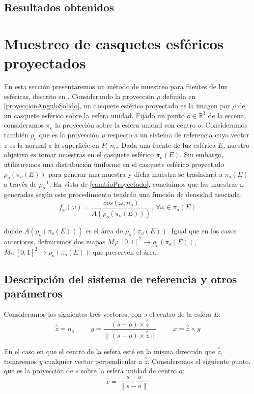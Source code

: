 \subsection{Resultados obtenidos}


\section{Muestreo de casquetes esféricos proyectados}

En esta sección presentaremos un método de muestreo para fuentes de luz esféricas, descrito en \cite{Urena2018}. Considerando la proyección $\rho$ definida en \ref{proyeccionAnguloSolido}, un casquete esférico proyectado es la imagen por $\rho$ de un casquete esférico sobre la esfera unidad. Fijado un punto $o\in\mathds{R}^3$ de la escena, consideramos $\pi_o$ la proyección sobre la esfera unidad con centro $o$. Consideramos también $\rho_o$ que es la proyección $\rho$ respecto a un sistema de referencia cuyo vector $z$ es la normal a la superficie en $P$, $n_o$. Dada una fuente de luz esférica $E$, nuestro objetivo es tomar muestras en el casquete esférico $\pi_o(E)$. Sin embargo, utilizaremos una distribución uniforme en el casquete esférico proyectado $\rho_o(\pi_o(E))$ para generar una muestra y dicha muestra se trasladará a $\pi_o(E)$ a través de $\rho_o^{-1}$. En vista de \ref{cambioProyectado}, concluimos que las muestras $\omega$ generadas según este procedimiento tendrán una función de densidad asociada:
$$f_{\omega}(\omega) = \frac{cos(\omega , n_o)}{A(\rho_o(\pi_o(E)))}\text{, }\forall \omega\in\pi_o(E)$$

donde $A(\rho_o(\pi_o(E)))$ es el área de $\rho_o(\pi_o(E))$. Igual que en los casos anteriores, definiremos dos mapas $M_s:[0,1]^2\rightarrow \rho_o(\pi_o(E))$, $M_t:[0,1]^2\rightarrow \rho_o(\pi_o(E))$ que preserven el área.

\subsection{Descripción del sistema de referencia y otros parámetros}
Consideramos los siguientes tres vectores, con $s$ el centro de la esfera $E$:
$$\overset{\wedge}{z} = n_o\hspace{1cm} y= \frac{(s-o)\times \overset{\wedge}{z}}{\|(s-o)\times \overset{\wedge}{z}\|} \hspace{1cm} x=\overset{\wedge}{z}\times y$$

En el caso en que el centro de la esfera esté en la misma dirección que $\overset{\wedge}{z}$, tomaremos $y$ cualquier vector perpendicular a $\overset{\wedge}{z}$. Consideremos el siguiente punto, que es la proyección de $s$ sobre la esfera unidad de centro $o$:
$$c=\frac{s-o}{\|s-o\|}$$

